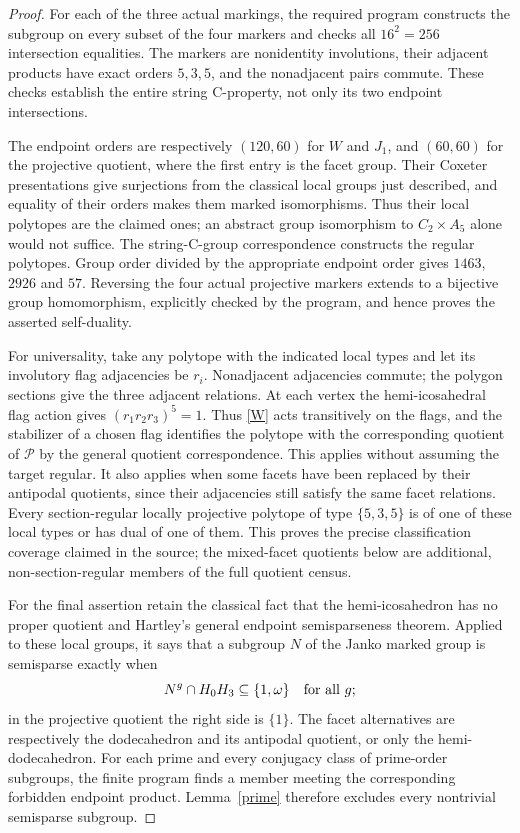 \begin{proof}
For each of the three actual markings, the required program constructs the subgroup on every subset of the four markers and checks all $16^2=256$ intersection equalities. The markers are nonidentity involutions, their adjacent products have exact orders $5,3,5$, and the nonadjacent pairs commute. These checks establish the entire string C-property, not only its two endpoint intersections.

The endpoint orders are respectively $(120,60)$ for $W$ and $J_1$, and $(60,60)$ for the projective quotient, where the first entry is the facet group. Their Coxeter presentations give surjections from the classical local groups just described, and equality of their orders makes them marked isomorphisms. Thus their local polytopes are the claimed ones; an abstract group isomorphism to $C_2\times A_5$ alone would not suffice. The string-C-group correspondence constructs the regular polytopes. Group order divided by the appropriate endpoint order gives $1463$, $2926$ and $57$. Reversing the four actual projective markers extends to a bijective group homomorphism, explicitly checked by the program, and hence proves the asserted self-duality.

For universality, take any polytope with the indicated local types and let its involutory flag adjacencies be $r_i$. Nonadjacent adjacencies commute; the polygon sections give the three adjacent relations. At each vertex the hemi-icosahedral flag action gives $(r_1r_2r_3)^5=1$. Thus \eqref{W} acts transitively on the flags, and the stabilizer of a chosen flag identifies the polytope with the corresponding quotient of $\mathcal P$ by the general quotient correspondence. This applies without assuming the target regular. It also applies when some facets have been replaced by their antipodal quotients, since their adjacencies still satisfy the same facet relations. Every section-regular locally projective polytope of type $\{5,3,5\}$ is of one of these local types or has dual of one of them. This proves the precise classification coverage claimed in the source; the mixed-facet quotients below are additional, non-section-regular members of the full quotient census.

For the final assertion retain the classical fact that the hemi-icosahedron has no proper quotient and Hartley's general endpoint semisparseness theorem. Applied to these local groups, it says that a subgroup $N$ of the Janko marked group is semisparse exactly when
\[
 N^g\cap H_0H_3\subseteq\{1,\omega\}\quad\hbox{for all }g;
\]
in the projective quotient the right side is $\{1\}$. The facet alternatives are respectively the dodecahedron and its antipodal quotient, or only the hemi-dodecahedron. For each prime and every conjugacy class of prime-order subgroups, the finite program finds a member meeting the corresponding forbidden endpoint product. Lemma~\ref{prime} therefore excludes every nontrivial semisparse subgroup.


\end{proof}
